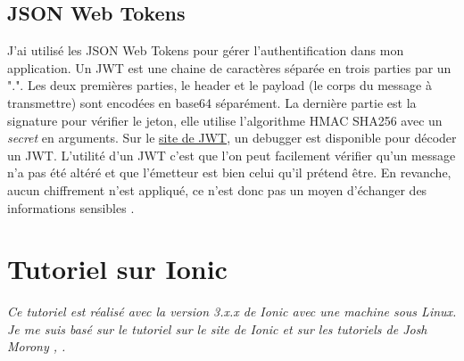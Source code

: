 \documentclass[a4paper, 12pt]{article}
\begin{document}
\subsection{JSON Web Tokens}
J'ai utilisé les JSON Web Tokens pour gérer l'authentification dans mon application. Un JWT est une chaine de 
caractères séparée en trois parties par un ".". Les deux premières parties, le header et le payload (le corps du 
message à transmettre) sont encodées en base64 séparément. La dernière partie est la signature pour vérifier le jeton, 
elle utilise l'algorithme HMAC SHA256 avec un \textit{secret} en arguments. Sur le \href{https://jwt.io/}{site de JWT}, 
un debugger est disponible pour décoder un JWT. L'utilité d'un JWT c'est que l'on peut facilement vérifier qu'un message 
n'a pas été altéré et que l'émetteur est bien celui qu'il prétend être. En revanche, aucun chiffrement n'est appliqué, 
ce n'est donc pas un moyen d'échanger des informations sensibles \cite{ref190}.


\section{Tutoriel sur Ionic}
\label{tuto_ionic}
\textit{Ce tutoriel est réalisé avec la version 3.x.x de Ionic avec une machine sous Linux. Je me suis basé sur  
le tutoriel sur le site de Ionic \cite{ref0} et sur les tutoriels de Josh Morony \cite{ref10}, \cite{ref20}.}
\end{document}
